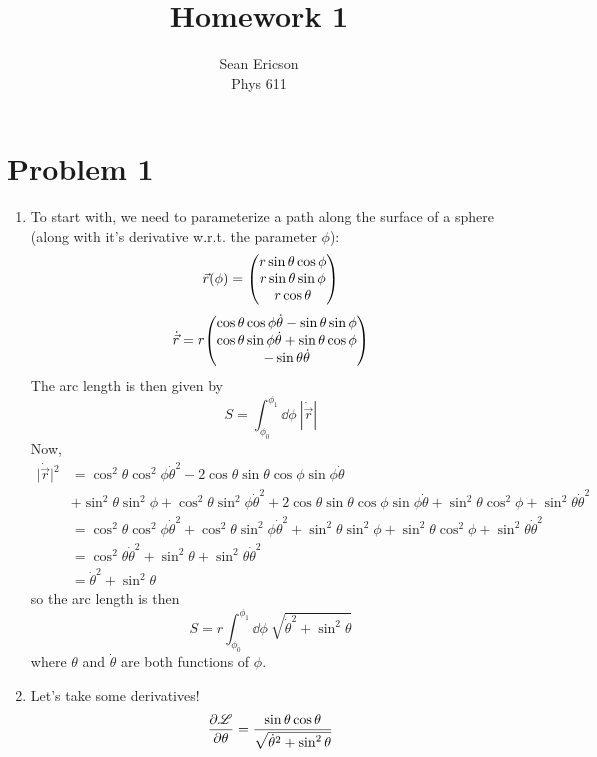 \documentclass[12pt]{article}
\newcommand{\magsq}[1]{\big|#1\big|^2}
\newcommand{\cint}[2]{\int_{#1}^{#2}}
\newcommand{\cintd}[3]{\cint{#1}{#2}\dd#3\:}
\begin{document}
\title{Homework 1}
\author{Sean Ericson \\ Phys 611}
\maketitle

\section*{Problem 1}
\begin{enumerate}[label=(\alph*)]
    \item To start with, we need to parameterize a path along the surface of a sphere (along with it's derivative w.r.t. the parameter $\phi$):
    \[ \vec{r}(\phi) = \mqty(r\sin\theta\cos\phi \\ r\sin\theta\sin\phi \\ r\cos\theta) \]
    \[ \dot{\vec{r}} = r\mqty(\cos\theta\cos\phi\dot{\theta} - \sin\theta\sin\phi \\ \cos\theta\sin\phi\dot{\theta} + \sin\theta\cos\phi \\ -\sin\theta\dot{\theta}) \]
    The arc length is then given by
    \[ S = \cintd{\phi_0}{\phi_1}{\phi} |\dot{\vec{r}}| \]
    Now,
    \begin{align*}
        \magsq{\dot{\vec{r}}} &= \cos^2\theta\cos^2\phi\dot{\theta}^2 - 2\cos\theta\sin\theta\cos\phi\sin\phi\dot{\theta}  \\ 
        &+ \sin^2\theta\sin^2\phi + \cos^2\theta\sin^2\phi\dot{\theta}^2 + 2\cos\theta\sin\theta\cos\phi\sin\phi\dot{\theta} + \sin^2\theta\cos^2\phi + \sin^2\theta\dot{\theta}^2 \\
        & = \cos^2\theta\cos^2\phi\dot{\theta}^2 + \cos^2\theta\sin^2\phi\dot{\theta}^2 + \sin^2\theta\sin^2\phi + \sin^2\theta\cos^2\phi + \sin^2\theta\dot{\theta}^2 \\
        &= \cos^2\theta\dot{\theta}^2 + \sin^2\theta + \sin^2\theta\dot{\theta}^2 \\
        &= \dot{\theta}^2 + \sin^2\theta
    \end{align*}
    so the arc length is then
    \[ \boxed{S = r\cintd{\phi_0}{\phi_1}{\phi}\sqrt{  \dot{\theta}^2 + \sin^2\theta}} \]
    where $\theta$ and $\dot{\theta}$ are both functions of $\phi$.
    \item Let's take some derivatives!
    \begin{align*}
        \pdv{\mathscr{L}}{\theta} &= \frac{\sin\theta\cos\theta}{\sqrt{\dot{\theta}^2 + \sin^2\theta}} \\

\end{align*}
\end{enumerate}
\end{document}
